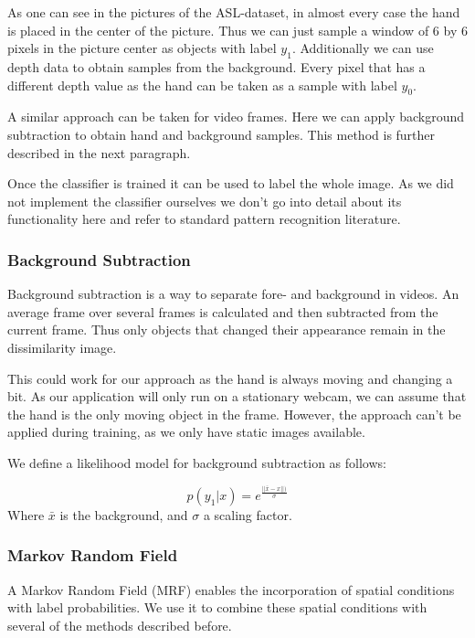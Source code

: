 \documentclass[letterpaper, 10 pt, conference]{ieeeconf}  %
\begin{document}
As one can see in the pictures of the ASL-dataset, in almost every case the hand is placed in the center of the picture. Thus we can just sample a window of 6 by 6 pixels in the picture center as objects with label $y_1$. Additionally we can use depth data to obtain samples from the background. Every pixel that has a different depth value as the hand can be taken as a sample with label $y_0$.

A similar approach can be taken for video frames. Here we can apply background subtraction to obtain hand and background samples. This method is further described in the next paragraph.

Once the classifier is trained it can be used to label the whole image. As we did not implement the classifier ourselves we don't go into detail about its functionality here and refer to standard pattern recognition literature.

\subsubsection{Background Subtraction}

Background subtraction is a way to separate fore- and background in videos. An average frame over several frames is calculated and then subtracted from the current frame. Thus only objects that changed their appearance remain in the dissimilarity image.

This could work for our approach as the hand is always moving and changing a bit. As our application will only run on a stationary webcam, we can assume that the hand is the only moving object in the frame. However, the approach can't be applied during training, as we only have static images available.

We define a likelihood model for background subtraction as follows:

\begin{equation}
p(y_1 | x) = e^{\frac{||\bar{x}-x||)}{\sigma}}
\label{eq:backg}
\end{equation}
Where $\bar{x}$ is the background, and $\sigma$ a scaling factor. 

\subsubsection{Markov Random Field}

A Markov Random Field (MRF) enables the incorporation of spatial conditions with label probabilities. We use it to combine these spatial conditions with several of the methods described before.
\end{document}
